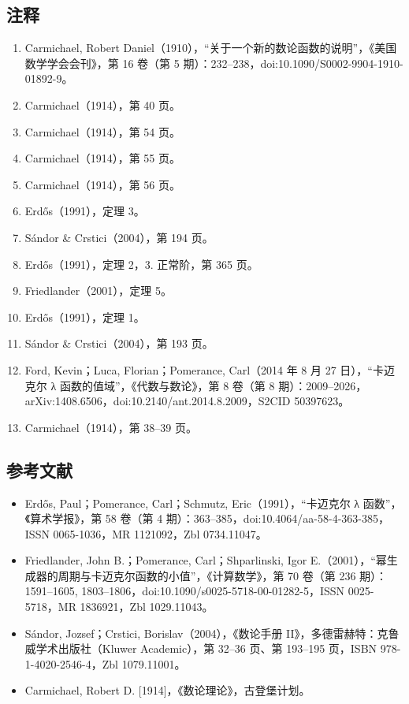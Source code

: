 \subsection{注释}
\begin{enumerate}
\item Carmichael, Robert Daniel（1910），“关于一个新的数论函数的说明”，《美国数学学会会刊》，第 16 卷（第 5 期）：232–238，doi:10.1090/S0002-9904-1910-01892-9。
\item Carmichael（1914），第 40 页。
\item Carmichael（1914），第 54 页。
\item Carmichael（1914），第 55 页。
\item Carmichael（1914），第 56 页。
\item Erdős（1991），定理 3。
\item Sándor & Crstici（2004），第 194 页。
\item Erdős（1991），定理 2，3. 正常阶，第 365 页。
\item Friedlander（2001），定理 5。
\item Erdős（1991），定理 1。
\item Sándor & Crstici（2004），第 193 页。
\item Ford, Kevin；Luca, Florian；Pomerance, Carl（2014 年 8 月 27 日），“卡迈克尔 λ 函数的值域”，《代数与数论》，第 8 卷（第 8 期）：2009–2026，arXiv:1408.6506，doi:10.2140/ant.2014.8.2009，S2CID 50397623。
\item Carmichael（1914），第 38–39 页。
\end{enumerate}
\subsection{参考文献}
\begin{itemize}
\item Erdős, Paul；Pomerance, Carl；Schmutz, Eric（1991），“卡迈克尔 λ 函数”，《算术学报》，第 58 卷（第 4 期）：363–385，doi:10.4064/aa-58-4-363-385，ISSN 0065-1036，MR 1121092，Zbl 0734.11047。
\item Friedlander, John B.；Pomerance, Carl；Shparlinski, Igor E.（2001），“幂生成器的周期与卡迈克尔函数的小值”，《计算数学》，第 70 卷（第 236 期）：1591–1605, 1803–1806，doi:10.1090/s0025-5718-00-01282-5，ISSN 0025-5718，MR 1836921，Zbl 1029.11043。
\item Sándor, Jozsef；Crstici, Borislav（2004），《数论手册 II》，多德雷赫特：克鲁威学术出版社（Kluwer Academic），第 32–36 页、第 193–195 页，ISBN 978-1-4020-2546-4，Zbl 1079.11001。
\item Carmichael, Robert D. [1914]，《数论理论》，古登堡计划。
\end{itemize}
